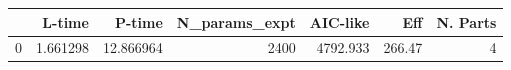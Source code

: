 \begin{tabular}{lrrrrrr}
\toprule
{} &    L-time &     P-time &  N\_params\_expt &  AIC-like &     Eff &  N. Parts \\
\midrule
0 &  1.661298 &  12.866964 &           2400 &  4792.933 &  266.47 &         4 \\
\bottomrule
\end{tabular}
